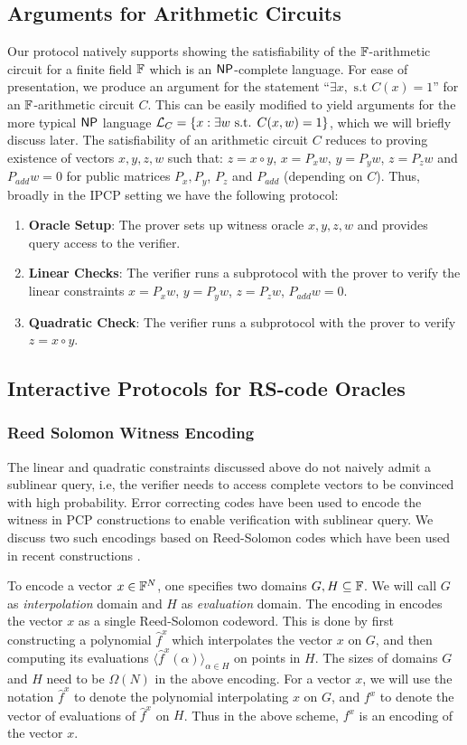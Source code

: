 \subsection{Arguments for Arithmetic Circuits}
Our protocol natively supports showing the 
satisfiability of the $\mathbb{F}$-arithmetic circuit for a finite field $\mathbb{F}$ which
is an $\mathsf{NP}$-complete language. For ease of presentation, we produce an argument for the
statement ``$\exists x, \text{ s.t } C(x)=1$'' for an $\mathbb{F}$-arithmetic circuit
$C$. This can be easily modified to
yield arguments for the more typical $\mathsf{NP}$ language $\mathcal{L}_C = \{x:\exists w
\text{ s.t. } C(x,w)=1\}$, which we will briefly discuss later. The
satisfiability of an arithmetic circuit $C$ reduces to proving existence of
vectors $x,y,z,w$ such that:
$z = x\circ y$,
$x = P_x w$,
$y = P_y w$,
$z = P_z w$ and
$P_{add} w = 0$ for public matrices $P_x,P_y$, $P_z$ and $P_{add}$ (depending on
$C$). Thus, broadly in the IPCP setting we have the following protocol:
\begin{enumerate}
\item {\bf Oracle Setup}: The prover sets up witness oracle
$x,y,z,w$ and provides query access to the verifier. 
\item {\bf Linear Checks}: The verifier runs a subprotocol with the prover to verify
the linear constraints $x=P_x w$, $y=P_y w$, $z=P_z w$, $P_{add} w = 0$.
\item {\bf Quadratic Check}: The verifier runs a subprotocol with the prover to
verify $z=x\circ y$.
\end{enumerate}

\subsection{Interactive Protocols for RS-code Oracles}
\subsubsection{Reed Solomon Witness Encoding}
The linear and quadratic constraints discussed above do not naively admit a
sublinear query, i.e, the verifier needs to access complete vectors to
be convinced with high probability. Error correcting codes have been used to
encode the witness in PCP constructions to enable verification with sublinear
query. We discuss two such encodings based on Reed-Solomon codes which have
been used in recent constructions \cite{Ligero2017,Aurora,STARK2019}.

To encode a vector $x\in \mathbb{F}^N$, one specifies two domains $G,H\subseteq \mathbb{F}$.
We will call $G$ as {\em interpolation} domain and $H$ as {\em evaluation} domain.
The encoding in \cite{Aurora} encodes the vector $x$ as a single Reed-Solomon
codeword. This is done by first constructing a polynomial $\hat{f}^x$ which
interpolates the vector $x$ on $G$, and then computing its evaluations
$\langle \hat{f}^x(\alpha) \rangle_{\alpha\in H}$ on points in $H$. The sizes
of domains $G$ and $H$ need to be $\Omega(N)$ in the above encoding. For a
vector $x$, we will use the notation $\hat{f}^x$ to denote the polynomial
interpolating $x$ on $G$, and $f^x$ to denote the vector of evaluations of
$\hat{f}^x$ on $H$. Thus in the above scheme, $f^x$ is an encoding of the
vector $x$.

